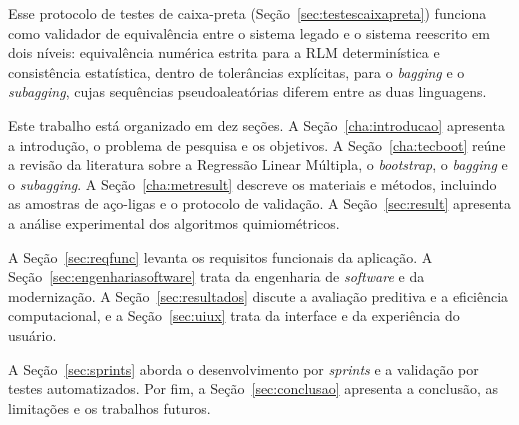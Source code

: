 Esse protocolo de testes de caixa-preta (Seção~\ref{sec:testescaixapreta}) funciona como validador de equivalência entre o sistema legado e o sistema reescrito em dois níveis: equivalência numérica estrita para a RLM determinística e consistência estatística, dentro de tolerâncias explícitas, para o \textit{bagging} e o \textit{subagging}, cujas sequências pseudoaleatórias diferem entre as duas linguagens.

Este trabalho está organizado em dez seções. A Seção~\ref{cha:introducao}
apresenta a introdução, o problema de pesquisa e os objetivos. A
Seção~\ref{cha:tecboot} reúne a revisão da literatura sobre a Regressão
Linear Múltipla, o \textit{bootstrap}, o \textit{bagging} e o \textit{subagging}.
A Seção~\ref{cha:metresult} descreve os materiais e métodos, incluindo as
amostras de aço-ligas e o protocolo de validação. A Seção~\ref{sec:result}
apresenta a análise experimental dos algoritmos quimiométricos.

A Seção~\ref{sec:reqfunc} levanta os requisitos funcionais da aplicação. A
Seção~\ref{sec:engenhariasoftware} trata da engenharia de \textit{software} e
da modernização. A Seção~\ref{sec:resultados} discute a avaliação preditiva e
a eficiência computacional, e a Seção~\ref{sec:uiux} trata da interface e da
experiência do usuário.

A Seção~\ref{sec:sprints} aborda o desenvolvimento por \textit{sprints} e a
validação por testes automatizados. Por fim, a Seção~\ref{sec:conclusao}
apresenta a conclusão, as limitações e os trabalhos futuros.